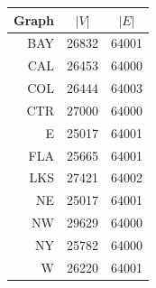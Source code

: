 \begin{tabular}{rcc}
\textbf{\textsf{Graph}} & $|V|$ & $|E|$ \\
\midrule
BAY & 26832 & 64001 \\
CAL & 26453 & 64000 \\
COL & 26444 & 64003 \\
CTR & 27000 & 64000 \\
E & 25017 & 64001 \\
FLA & 25665 & 64001 \\
LKS & 27421 & 64002 \\
NE & 25017 & 64001 \\
NW & 29629 & 64000 \\
NY & 25782 & 64000 \\
W & 26220 & 64001 \\
\end{tabular}